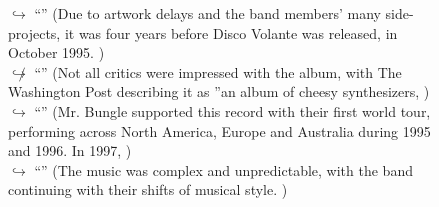 \documentclass[11pt,a4paper, onecolumn]{article}
\begin{document}
\begin{figure}[t] \small \begin{tcolorbox}[boxsep=0pt,left=5pt,right=0pt,top=2pt,colback = yellow!5] \begin{dialogue}
 \small 
\colorbox{pink!25}{$\hookrightarrow$}
{ ``'' (Due to artwork delays and the band members' many side-projects, it was four years before Disco Volante was released, in October 1995. ) }
\\
\colorbox{pink!25}{$\not\hookrightarrow$}
{ ``'' (Not all critics were impressed with the album, with The Washington Post describing it as ''an album of cheesy synthesizers, ) }
\\
\colorbox{pink!25}{$\hookrightarrow$}
{ ``'' (Mr. Bungle supported this record with their first world tour, performing across North America, Europe and Australia during 1995 and 1996. In 1997, ) }
\\
\colorbox{pink!25}{$\hookrightarrow$}
{ ``'' (The music was complex and unpredictable, with the band continuing with their shifts of musical style. ) }
\\
 \end{dialogue}\end{tcolorbox}\end{figure}
\end{document}
